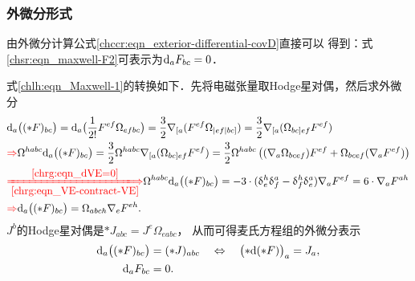 \subsubsection{外微分形式}
由外微分计算公式\eqref{chccr:eqn_exterior-differential-covD}直接可以
得到：式\eqref{chsr:eqn_maxwell-F2}可表示为${\rm d}_a F_{bc}=0$．

式\eqref{chlh:eqn_Maxwell-1}的转换如下．先将电磁张量取Hodge星对偶，然后求外微分
\setlength{\mathindent}{0em}
\begin{align*}
    &{\rm d}_a \bigl((*F)_{bc} \bigr)  ={\rm d}_a \bigl(\frac{1}{2!}F^{ef}\Omega_{efbc} \bigr)
    = \frac{3}{2} \nabla _{[a} (F^{ef}\Omega_{|ef|bc]} )
    = \frac{3}{2} \nabla _{[a} (\Omega_{bc]ef} F^{ef}) \\
    &{\color{red}\Rightarrow}
    \Omega^{habc}{\rm d}_a \bigl((*F)_{bc} \bigr)  = \frac{3}{2} \Omega^{habc} \nabla _{[a} (\Omega_{bc]ef} F^{ef})
    =\frac{3}{2} \Omega^{habc} \left((\nabla _{a} \Omega_{bcef}) F^{ef} +\Omega_{bcef} (\nabla _{a}F^{ef}) \right) \\
    &{\color{red}\xLongrightarrow[\ref{chrg:eqn_VE-contract-VE}]{\ref{chrg:eqn_dVE=0}} }
    \Omega^{habc}{\rm d}_a \bigl((*F)_{bc} \bigr)  = - 3\cdot
    (\updelta_{e}^{h}\updelta_{f}^{a} -\updelta_{f}^{h}\updelta_{e}^{a} )\nabla _{a}F^{ef}
    = 6\cdot \nabla _{a}F^{ah} \\
    &{\color{red}\Rightarrow}
    {\rm d}_a \bigl((*F)_{bc} \bigr) = \Omega_{abch} \nabla _{e}F^{eh} .
\end{align*}\setlength{\mathindent}{2em}
$J^b$的Hodge星对偶是$*J_{abc} = {J^e}\Omega_{eabc}$，
从而可得麦氏方程组的外微分表示
\begin{subequations}\label{chlh:eqn_Maxwell-ext-diff}
    \begin{align}
        {\rm d}_a \bigl((*F)_{bc} \bigr)&= (*J)_{abc}  \quad \Leftrightarrow \quad
        \bigl(*{\rm d}(*F) \bigr)_a = J_a , \label{chlh:eqn_Maxwell-ext-diff-1} \\
        {\rm d}_a F_{bc} &= 0.      \label{chlh:eqn_Maxwell-ext-diff-2}
    \end{align}
\end{subequations}


